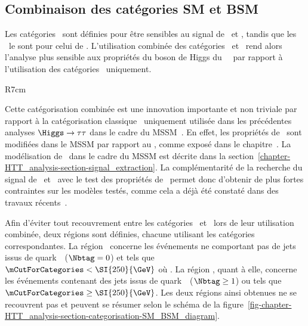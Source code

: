 \subsection{Combinaison des catégories SM et BSM}\label{chapter-HTT_analysis-section-categorisation-SM_and_BSM}
Les catégories \CATbsm\ sont définies pour être sensibles au signal de \Higgs\ et \HiggsA,
tandis que les \CATsm\ le sont pour celui de \higgs.
L'utilisation combinée des catégories \CATsm\ et \CATbsm\ rend alors l'analyse plus sensible aux propriétés du boson de Higgs du \SM\ \higgs\ par rapport à l'utilisation des catégories \CATbsm\ uniquement.
\begin{wrapfigure}{R}{7cm}
\centering

\caption{Définition des deux régions utilisant des catégories différentes.}
\label{fig-chapter-HTT_analysis-section-categorisation-SM_BSM_diagram}
\end{wrapfigure}
\par
Cette catégorisation combinée est une innovation importante et non triviale par rapport à la catégorisation classique \og \CATbsm\ uniquement \fg{} utilisée dans les précédentes analyses $\Higgs\to\tau\tau$ dans le cadre du MSSM~\cite{CMS-PAS-HIG-13-021,CMS-PAS-HIG-14-029,CMS-PAS-HIG-17-020}.
En effet, les propriétés de \higgs\ sont modifiées dans le MSSM par rapport au \SM, comme exposé dans le chapitre~.
La modélisation de \higgs\ dans le cadre du MSSM est décrite dans la section~\ref{chapter-HTT_analysis-section-signal_extraction}.
La complémentarité de la recherche du signal de \Higgs\ et \HiggsA\ avec le test des propriétés de \higgs\ permet donc d'obtenir de plus fortes contraintes sur les modèles testés, comme cela a déjà été constaté dans des travaux récents~\cite{Artur_thesis}.
\par
Afin d'éviter tout recouvrement entre les catégories \CATsm\ et \CATbsm\ lors de leur utilisation combinée, deux régions sont définies, chacune utilisant les catégories correspondantes.
La région \CATsm\ concerne les événements ne comportant pas de jets issus de quark~\quarkb\ ($\Nbtag=0$) et tels que $\mCutForCategories < \SI{250}{\GeV}$ où
\mCutForCategoriesdef.
La région \CATbsm, quant à elle, concerne les événements contenant des jets issus de quark~\quarkb\ ($\Nbtag\geq1$) ou tels que $\mCutForCategories \geq \SI{250}{\GeV}$.
Les deux régions ainsi obtenues ne se recouvrent pas et peuvent se résumer selon le schéma de la figure~\ref{fig-chapter-HTT_analysis-section-categorisation-SM_BSM_diagram}.
